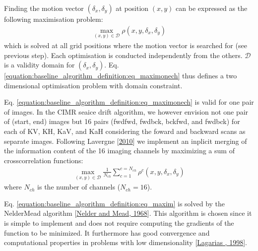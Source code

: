 \documentclass[letterpaper,10pt,english]{jupyterBook}
\begin{document}
\sphinxAtStartPar
Finding the motion vector \((\delta_x,\delta_y)\) at position \((x,y)\) can
be expressed as the following maximisation problem:
\begin{equation}\label{equation:baseline_algorithm_definition:eq_maximonech}
\begin{split}
\max_{(x,y)\in\mathcal{D}} \rho(x,y,\delta_x,\delta_y)
\end{split}
\end{equation}
\sphinxAtStartPar
which is solved at all grid positions where the motion vector is searched for (see previous step). Each optimisation is conducted independently
from the others. \(\mathcal{D}\) is a validity domain for \((\delta_x,\delta_y)\). Eq. \eqref{equation:baseline_algorithm_definition:eq_maximonech} thus defines a two dimensional optimisation
problem with domain constraint.

\sphinxAtStartPar
Eq. \eqref{equation:baseline_algorithm_definition:eq_maximonech} is valid for one pair of images. In the CIMR sea\sphinxhyphen{}ice drift algorithm, we however envision not one pair of (start, end) images but 16 pairs
(fwd\sphinxhyphen{}fwd, fwd\sphinxhyphen{}bck, bck\sphinxhyphen{}fwd, and fwd\sphinxhyphen{}bck) for each of K\sphinxhyphen{}V, K\sphinxhyphen{}H, Ka\sphinxhyphen{}V, and Ka\sphinxhyphen{}H considering the foward and backward scans as separate images. Following Lavergne  {[}\hyperlink{cite.references:id19}{2010}{]}
we implement an inplicit merging of the information content of the 16 imaging channels by maximizing a sum of cross\sphinxhyphen{}correlation functions:
\begin{equation}\label{equation:baseline_algorithm_definition:eq_maxim}
\begin{split}
\max_{(x,y)\in\mathcal{D}} \frac{1}{N_{ch}} \sum_{c=1}^{c=N_{ch}} \rho^{c}(x,y,\delta_x,\delta_y)
\end{split}
\end{equation}
\sphinxAtStartPar
where \(N_{ch}\) is the number of channels (\(N_{ch} = 16\)).

\sphinxAtStartPar
Eq. \eqref{equation:baseline_algorithm_definition:eq_maxim} is solved by the Nelder\sphinxhyphen{}Mead algorithm {[}\hyperlink{cite.references:id24}{Nelder and Mead, 1968}{]}. This algorithm is
chosen since it is simple to implement and does not require computing the gradients of the function to be minimized. It furthermore has good convergence
and computational properties in problems with low dimensionality {[}\hyperlink{cite.references:id18}{Lagarias , 1998}{]}.
\end{document}
